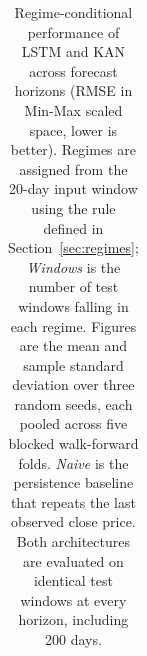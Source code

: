\begin{table}[!ht]
\begin{tabular}{|l|l|c|c|c|c|c|}
\hline
\end{tabular}
\caption{Regime-conditional performance of LSTM and KAN across forecast horizons (RMSE in Min-Max scaled space, lower is better). Regimes are assigned from the 20-day input window using the rule defined in Section~\ref{sec:regimes}; \emph{Windows} is the number of test windows falling in each regime. Figures are the mean and sample standard deviation over three random seeds, each pooled across five blocked walk-forward folds. \emph{Naive} is the persistence baseline that repeats the last observed close price. Both architectures are evaluated on identical test windows at every horizon, including 200 days.}
\label{table_regime_comparison}
\end{table}
